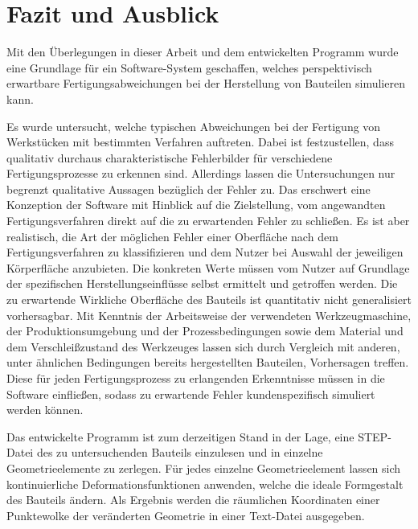 \section{Fazit und Ausblick}

Mit den Überlegungen in dieser Arbeit und dem entwickelten Programm wurde eine Grundlage für ein Software-System geschaffen, welches perspektivisch erwartbare Fertigungsabweichungen bei der Herstellung von Bauteilen simulieren kann.

Es wurde untersucht, welche typischen Abweichungen bei der Fertigung von Werkstücken mit bestimmten Verfahren auftreten. Dabei ist festzustellen, dass qualitativ durchaus charakteristische Fehlerbilder für verschiedene Fertigungsprozesse zu erkennen sind. Allerdings lassen die Untersuchungen nur begrenzt qualitative Aussagen bezüglich der Fehler zu. Das erschwert eine Konzeption der Software mit Hinblick auf die Zielstellung, vom angewandten Fertigungsverfahren direkt auf die zu erwartenden Fehler zu schließen. Es ist aber realistisch, die Art der möglichen Fehler einer Oberfläche nach dem Fertigungsverfahren zu klassifizieren und dem Nutzer bei Auswahl der jeweiligen Körperfläche anzubieten. Die konkreten Werte müssen vom Nutzer auf Grundlage der spezifischen Herstellungseinflüsse selbst ermittelt und getroffen werden. Die zu erwartende Wirkliche Oberfläche des Bauteils ist quantitativ nicht generalisiert vorhersagbar. Mit Kenntnis der Arbeitsweise der verwendeten Werkzeugmaschine, der Produktionsumgebung und der Prozessbedingungen sowie dem Material und dem Verschleißzustand des Werkzeuges lassen sich durch Vergleich mit anderen, unter ähnlichen Bedingungen bereits hergestellten Bauteilen, Vorhersagen treffen.
Diese für jeden Fertigungsprozess zu erlangenden Erkenntnisse müssen in die Software einfließen, sodass zu erwartende Fehler kundenspezifisch simuliert werden können. 

Das entwickelte Programm ist zum derzeitigen Stand in der Lage, eine STEP-Datei des zu untersuchenden Bauteils einzulesen und in einzelne Geometrieelemente zu zerlegen. Für jedes einzelne Geometrieelement lassen sich kontinuierliche Deformationsfunktionen anwenden, welche die ideale Formgestalt des Bauteils ändern. Als Ergebnis werden die räumlichen Koordinaten einer Punktewolke der veränderten Geometrie in einer Text-Datei ausgegeben. 


